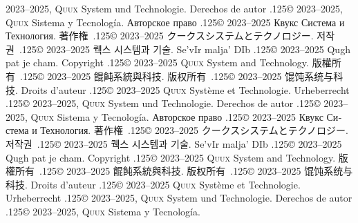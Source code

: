 \documentclass{cookbook}
\begin{document}
{{{	2023--2025, \textsc{Quux} System und Technologie.
Derechos de autor {\lower.125\baselineskip\hbox{\copyright}} %
	2023--2025, \textsc{Quux} Sistema y Tecnología.
\foreignlanguage{russian}{Авторское право} %
	{\lower.125\baselineskip\hbox{\copyright}}
	2023–2025 \foreignlanguage{russian}{Квукс Система и Технология.}
著作権~{\lower.125\baselineskip\hbox{\copyright}}
	2023--2025 クークスシステムとテクノロジー.
저작권~{\lower.125\baselineskip\hbox{\copyright}}
	2023--2025 퀙스 시스템과 기술.
Se'vIr malja' DIb {\lower.125\baselineskip\hbox{\copyright}} %
	2023--2025 Qugh pat je cham.
\ddag\texttt{{\gitabbrcommithash}}
Copyright {\lower.125\baselineskip\hbox{\copyright}}
	2023--2025 \textsc{Quux} System and Technology.
版權所有~{\lower.125\baselineskip\hbox{\copyright}}
	2023--2025 餛飩系統與科技.
版权所有~{\lower.125\baselineskip\hbox{\copyright}}
	2023--2025 馄饨系统与科技.
Droits d'auteur {\lower.125\baselineskip\hbox{\copyright}} %
	2023--2025 \textsc{Quux} Système et Technologie.
Urheberrecht {\lower.125\baselineskip\hbox{\copyright}} %
	2023--2025, \textsc{Quux} System und Technologie.
Derechos de autor {\lower.125\baselineskip\hbox{\copyright}} %
	2023--2025, \textsc{Quux} Sistema y Tecnología.
\foreignlanguage{russian}{Авторское право} %
	{\lower.125\baselineskip\hbox{\copyright}}
	2023–2025 \foreignlanguage{russian}{Квукс Система и Технология.}
著作権~{\lower.125\baselineskip\hbox{\copyright}}
	2023--2025 クークスシステムとテクノロジー.
저작권~{\lower.125\baselineskip\hbox{\copyright}}
	2023--2025 퀙스 시스템과 기술.
Se'vIr malja' DIb {\lower.125\baselineskip\hbox{\copyright}} %
	2023--2025 Qugh pat je cham.
\texttt{{\gitabbrcommithash}}
Copyright {\lower.125\baselineskip\hbox{\copyright}}
	2023--2025 \textsc{Quux} System and Technology.
版權所有~{\lower.125\baselineskip\hbox{\copyright}}
	2023--2025 餛飩系統與科技.
版权所有~{\lower.125\baselineskip\hbox{\copyright}}
	2023--2025 馄饨系统与科技.
Droits d'auteur {\lower.125\baselineskip\hbox{\copyright}} %
	2023--2025 \textsc{Quux} Système et Technologie.
Urheberrecht {\lower.125\baselineskip\hbox{\copyright}} %
	2023--2025, \textsc{Quux} System und Technologie.
Derechos de autor {\lower.125\baselineskip\hbox{\copyright}} %
	2023--2025, \textsc{Quux} Sistema y Tecnología.
}}}
\end{document}

